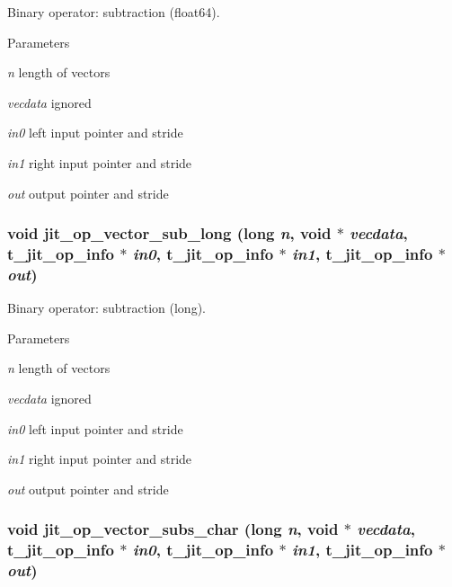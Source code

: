Binary operator: subtraction (float64). 
\begin{DoxyParams}{Parameters}
\item[{\em n}]length of vectors \item[{\em vecdata}]ignored \item[{\em in0}]left input pointer and stride \item[{\em in1}]right input pointer and stride \item[{\em out}]output pointer and stride \end{DoxyParams}
\hypertarget{group__opvecmod_gabb14bd485004dafe45778194102e2dae}{
\subsubsection[{jit\_\-op\_\-vector\_\-sub\_\-long}]{\setlength{\rightskip}{0pt plus 5cm}void jit\_\-op\_\-vector\_\-sub\_\-long (long {\em n}, \/  void $\ast$ {\em vecdata}, \/  {\bf t\_\-jit\_\-op\_\-info} $\ast$ {\em in0}, \/  {\bf t\_\-jit\_\-op\_\-info} $\ast$ {\em in1}, \/  {\bf t\_\-jit\_\-op\_\-info} $\ast$ {\em out})}}
\label{group__opvecmod_gabb14bd485004dafe45778194102e2dae}


Binary operator: subtraction (long). 
\begin{DoxyParams}{Parameters}
\item[{\em n}]length of vectors \item[{\em vecdata}]ignored \item[{\em in0}]left input pointer and stride \item[{\em in1}]right input pointer and stride \item[{\em out}]output pointer and stride \end{DoxyParams}
\hypertarget{group__opvecmod_gae838f44d5875c250bb4a79d2709d4feb}{
\subsubsection[{jit\_\-op\_\-vector\_\-subs\_\-char}]{\setlength{\rightskip}{0pt plus 5cm}void jit\_\-op\_\-vector\_\-subs\_\-char (long {\em n}, \/  void $\ast$ {\em vecdata}, \/  {\bf t\_\-jit\_\-op\_\-info} $\ast$ {\em in0}, \/  {\bf t\_\-jit\_\-op\_\-info} $\ast$ {\em in1}, \/  {\bf t\_\-jit\_\-op\_\-info} $\ast$ {\em out})}}
\label{group__opvecmod_gae838f44d5875c250bb4a79d2709d4feb}


